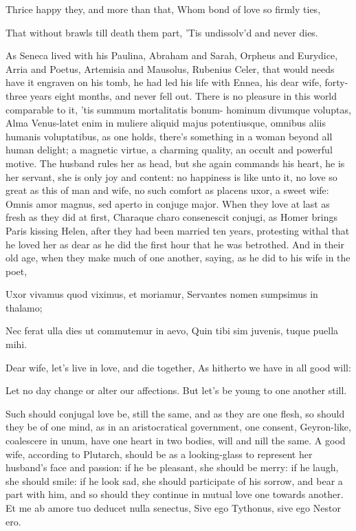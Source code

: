 {Thrice happy they, and more than that,
Whom bond of love so firmly ties,

That without brawls till death them part,
'Tis undissolv'd and never dies.

As Seneca lived with his Paulina, Abraham and Sarah, Orpheus and
Eurydice, Arria and Poetus, Artemisia and Mausolus, Rubenius Celer,
that would needs have it engraven on his tomb, he had led his life with
Ennea, his dear wife, forty-three years eight months, and never fell
out. There is no pleasure in this world comparable to it, 'tis summum
mortalitatis bonum- hominum divumque voluptas, Alma Venus-latet
enim in muliere aliquid majus potentiusque, omnibus aliis humanis
voluptatibus, as one holds, there's something in a woman beyond
all human delight; a magnetic virtue, a charming quality, an occult and
powerful motive. The husband rules her as head, but she again commands
his heart, he is her servant, she is only joy and content: no happiness
is like unto it, no love so great as this of man and wife, no such
comfort as placens uxor, a sweet wife: Omnis amor magnus,
sed aperto in conjuge major. When they love at last as fresh as they
did at first, Charaque charo consenescit conjugi, as Homer brings
Paris kissing Helen, after they had been married ten years, protesting
withal that he loved her as dear as he did the first hour that he was
betrothed. And in their old age, when they make much of one another,
saying, as he did to his wife in the poet,

Uxor vivamus quod viximus, et moriamur,
Servantes nomen sumpsimus in thalamo;

Nec ferat ulla dies ut commutemur in aevo,
Quin tibi sim juvenis, tuque puella mihi.


Dear wife, let's live in love, and die together,
As hitherto we have in all good will:

Let no day change or alter our affections.
But let's be young to one another still.

Such should conjugal love be, still the same, and as they are one
flesh, so should they be of one mind, as in an aristocratical
government, one consent, Geyron-like, coalescere in unum, have
one heart in two bodies, will and nill the same. A good wife, according
to Plutarch, should be as a looking-glass to represent her husband's
face and passion: if he be pleasant, she should be merry: if he laugh,
she should smile: if he look sad, she should participate of his sorrow,
and bear a part with him, and so should they continue in mutual love
one towards another.
Et me ab amore tuo deducet nulla senectus,
Sive ego Tythonus, sive ego Nestor ero.

}
